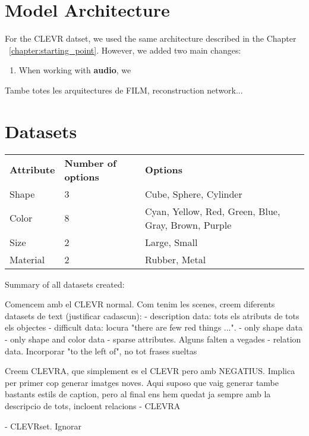 \section{Model Architecture}

For the CLEVR datset, we used the same architecture described in the Chapter ~\ref{chapter:starting_point}. However, we added two main changes:
\begin{enumerate}
    \item When working with \textbf{audio}, we 
\end{enumerate}

Tambe totes les arquitectures de FILM, reconstruction network...

\section{Datasets}



\label{sec:datasets}

\begin{table}[h]
\begin{tabular}{lll}
\textbf{Attribute} & \textbf{Number of options} & \textbf{Options}
\\ Shape    & 3 & Cube, Sphere, Cylinder 
\\ Color    & 8 & Cyan, Yellow, Red, Green, Blue, Gray, Brown, Purple 
\\ Size     & 2 & Large, Small 
\\ Material & 2 & Rubber, Metal  
\end{tabular}
\end{table}

Summary of all datasets created:

Comencem amb el CLEVR normal. Com tenim les scenes, creem diferents datasets de text (justificar cadascun):
- description data: tots els atributs de tots els objectes
- difficult data: locura "there are few red things ...". 
- only shape data
- only shape and color data
- sparse attributes. Alguns falten a vegades
- relation data. Incorporar "to the left of", no tot frases sueltas

Creem CLEVRA, que simplement es el CLEVR pero amb NEGATIUS. Implica per primer cop generar imatges noves. Aqui suposo que vaig generar tambe bastants estils de caption, pero al final ens hem quedat ja sempre amb la descripcio de tots, incloent relacions
- CLEVRA



- CLEVRset. Ignorar


